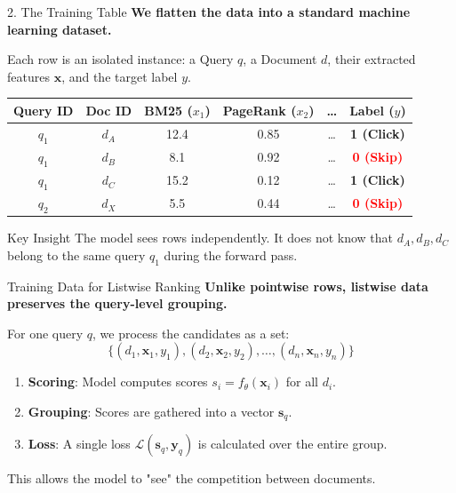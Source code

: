 \documentclass[aspectratio=169]{beamer}
\begin{document}
\begin{frame}[shrink=5]{2. The Training Table}
\textbf{We flatten the data into a standard machine learning dataset.}

\vspace{0.8em}
Each row is an isolated instance: a Query $q$, a Document $d$, their extracted features $\mathbf{x}$, and the target label $y$.

\vspace{1em}
\begin{center}
\small
\begin{tabular}{cc | ccc | c}
\toprule
\textbf{Query ID} & \textbf{Doc ID} & \textbf{BM25 ($x_1$)} & \textbf{PageRank ($x_2$)} & \dots & \textbf{Label ($y$)} \\
\midrule
$q_1$ & $d_A$ & 12.4 & 0.85 & \dots & \textcolor{green!70!black}{\textbf{1 (Click)}} \\
$q_1$ & $d_B$ & 8.1 & 0.92 & \dots & \textcolor{red}{\textbf{0 (Skip)}} \\
$q_1$ & $d_C$ & 15.2 & 0.12 & \dots & \textcolor{green!70!black}{\textbf{1 (Click)}} \\
\midrule
$q_2$ & $d_X$ & 5.5 & 0.44 & \dots & \textcolor{red}{\textbf{0 (Skip)}} \\
\bottomrule
\end{tabular}
\end{center}
\vspace{0.5em}
\begin{exampleblock}{Key Insight}
The model sees rows independently. It does not know that $d_A, d_B, d_C$ belong to the same query $q_1$ during the forward pass.
\end{exampleblock}
\end{frame}

\begin{frame}{Training Data for Listwise Ranking}
\textbf{Unlike pointwise rows, listwise data preserves the query-level grouping.}

\vspace{1em}
For one query $q$, we process the candidates as a set:
\[
\{ (d_1, \mathbf{x}_1, y_1), (d_2, \mathbf{x}_2, y_2), \dots, (d_n, \mathbf{x}_n, y_n) \}
\]

\vspace{0.8em}
\begin{enumerate}
    \item \textbf{Scoring}: Model computes scores $s_i = f_\theta(\mathbf{x}_i)$ for all $d_i$.
    \item \textbf{Grouping}: Scores are gathered into a vector $\mathbf{s}_q$.
    \item \textbf{Loss}: A single loss $\mathcal{L}(\mathbf{s}_q, \mathbf{y}_q)$ is calculated over the entire group.
\end{enumerate}

\vspace{0.8em}
\alert{This allows the model to "see" the competition between documents.}
\end{frame}
\end{document}

